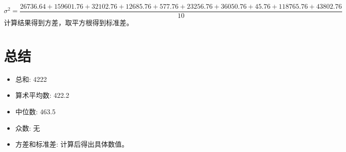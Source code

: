 \documentclass{article}
\begin{document}
\[
\sigma^2 = \frac{26736.64 + 159601.76 + 32102.76 + 12685.76 + 577.76 + 23256.76 + 36050.76 + 45.76 + 118765.76 + 43802.76}{10}
\]
计算结果得到方差，取平方根得到标准差。

\section{总结}

\begin{itemize}
    \item 总和: 4222
    \item 算术平均数: 422.2
    \item 中位数: 463.5
    \item 众数: 无
    \item 方差和标准差: 计算后得出具体数值。
\end{itemize}
\end{document}
